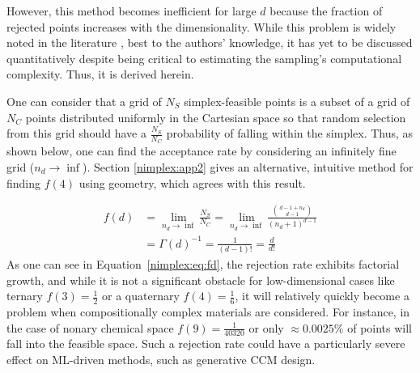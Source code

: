 However, this method becomes inefficient for large $d$ because the fraction of rejected points increases with the dimensionality. While this problem is widely noted in the literature \cite{Allen2022AAlloys}, best to the authors' knowledge, it has yet to be discussed quantitatively despite being critical to estimating the sampling's computational complexity. Thus, it is derived herein.

One can consider that a grid of $N_S$ simplex-feasible points is a subset of a grid of $N_C$ points distributed uniformly in the Cartesian space so that random selection from this grid should have a $\frac{N_S}{N_C}$ probability of falling within the simplex. Thus, as shown below, one can find the acceptance rate by considering an infinitely fine grid ($n_d\rightarrow\inf$). Section \ref{nimplex:app2} gives an alternative, intuitive method for finding $f(4)$ using geometry, which agrees with this result.

\begin{equation}
    \begin{aligned}
        f(d) &= \lim_{n_d\rightarrow\inf} \frac{N_S}{N_C} = \lim_{n_d\rightarrow\inf} \frac{\binom{d-1+n_d}{d-1}}{(n_d+1)^{d-1}}\\
        &= \Gamma(d)^{-1} = \frac{1}{(d-1)!} = \frac{d}{d!}
    \end{aligned}
    \label{nimplex:eq:fd}
\end{equation}
As one can see in Equation~\ref{nimplex:eq:fd}, the rejection rate exhibits factorial growth, and while it is not a significant obstacle for low-dimensional cases like ternary $f(3)=\frac{1}{2}$ or a quaternary $f(4) = \frac{1}{6}$, it will relatively quickly become a problem when compositionally complex materials are considered. For instance, in the case of nonary chemical space $f(9) = \frac{1}{40320}$ or only $\approx0.0025\%$ of points will fall into the feasible space. Such a rejection rate could have a particularly severe effect on ML-driven methods, such as generative CCM design.

